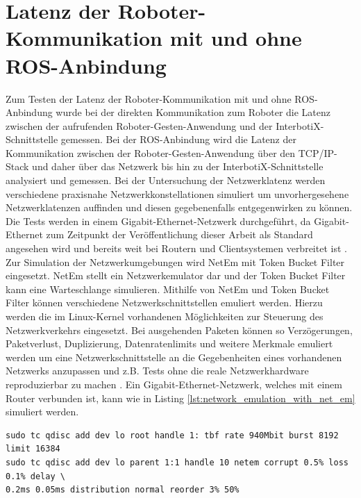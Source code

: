 \section{Latenz der Roboter-Kommunikation mit und ohne ROS-Anbindung}
Zum Testen der Latenz der Roboter-Kommunikation mit und ohne ROS-Anbindung wurde bei der direkten Kommunikation zum Roboter die Latenz zwischen der aufrufenden Roboter-Gesten-Anwendung und der InterbotiX-Schnittstelle gemessen. Bei der ROS-Anbindung wird die Latenz der Kommunikation zwischen der Roboter-Gesten-Anwendung über den TCP/IP-Stack und daher über das Netzwerk bis hin zu der InterbotiX-Schnittstelle analysiert und gemessen. Bei der Untersuchung der Netzwerklatenz werden verschiedene praxisnahe Netzwerkkonstellationen simuliert um unvorhergesehene Netzwerklatenzen auffinden und diesen gegebenenfalls entgegenwirken zu können. Die Tests werden in einem Gigabit-Ethernet-Netzwerk durchgeführt, da Gigabit-Ethernet zum Zeitpunkt der Veröffentlichung dieser Arbeit als Standard angesehen wird und bereits weit bei Routern und Clientsystemen verbreitet ist \cite{gigabit_ethernet_2020}.\\

Zur Simulation der Netzwerkumgebungen wird NetEm mit Token Bucket Filter eingesetzt. NetEm stellt ein Netzwerkemulator dar und der Token Bucket Filter kann eine Warteschlange simulieren. Mithilfe von NetEm und Token Bucket Filter können verschiedene Netzwerkschnittstellen emuliert werden. Hierzu werden die im Linux-Kernel vorhandenen Möglichkeiten zur Steuerung des Netzwerkverkehrs eingesetzt. Bei ausgehenden Paketen können so Verzögerungen, Paketverlust, Duplizierung, Datenratenlimits und weitere Merkmale emuliert werden um eine Netzwerkschnittstelle an die Gegebenheiten eines vorhandenen Netzwerks anzupassen und z.B. Tests ohne die reale Netzwerkhardware reproduzierbar zu machen \cite{hemminger_network_nodate}. Ein Gigabit-Ethernet-Netzwerk, welches mit einem Router verbunden ist, kann wie in Listing \ref{lst:network_emulation_with_net_em} simuliert werden.\newline\vspace{-1.0em}

\begin{lstlisting}[style=bash, caption={Gigabit-Ethernet-Netzwerkemulation mit NetEm und Token Bucket Filter}, label={lst:network_emulation_with_net_em}]
sudo tc qdisc add dev lo root handle 1: tbf rate 940Mbit burst 8192 limit 16384
sudo tc qdisc add dev lo parent 1:1 handle 10 netem corrupt 0.5% loss 0.1% delay \
0.2ms 0.05ms distribution normal reorder 3% 50%
\end{lstlisting}\leavevmode\newline\vspace{-1.0em}


